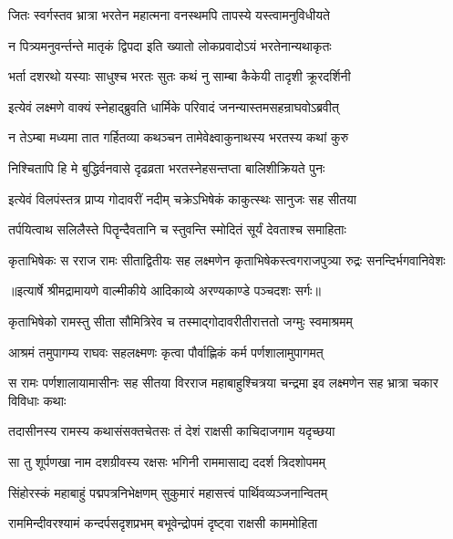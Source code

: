 \twolineshloka
{जितः स्वर्गस्तव भ्रात्रा भरतेन महात्मना}
{वनस्थमपि तापस्ये यस्त्वामनुविधीयते} %

\twolineshloka
{न पित्र्यमनुवर्न्तन्ते मातृकं द्विपदा इति}
{ख्यातो लोकप्रवादोऽयं भरतेनान्यथाकृतः} %

\twolineshloka
{भर्ता दशरथो यस्याः साधुश्च भरतः सुतः}
{कथं नु साम्बा कैकेयी तादृशी क्रूरदर्शिनी} %

\twolineshloka
{इत्येवं लक्ष्मणे वाक्यं स्नेहाद्ब्रुवति धार्मिके}
{परिवादं जनन्यास्तमसहन्राघवोऽब्रवीत्} %

\twolineshloka
{न तेऽम्बा मध्यमा तात गर्हितव्या कथञ्चन}
{तामेवेक्ष्वाकुनाथस्य भरतस्य कथां कुरु} %

\twolineshloka
{निश्चितापि हि मे बुद्धिर्वनवासे दृढव्रता}
{भरतस्नेहसन्तप्ता बालिशीक्रियते पुनः} %

\twolineshloka
{इत्येवं विलपंस्तत्र प्राप्य गोदावरीं नदीम्}
{चक्रेऽभिषेकं काकुत्स्थः सानुजः सह सीतया} %

\twolineshloka
{तर्पयित्वाथ सलिलैस्ते पितॄन्दैवतानि च}
{स्तुवन्ति स्मोदितं सूर्यं देवताश्च समाहिताः} %

\fourlineindentedshloka
{कृताभिषेकः स रराज रामः}
{सीताद्वितीयः सह लक्ष्मणेन}
{कृताभिषेकस्त्वगराजपुत्र्या}
{रुद्रः सनन्दिर्भगवानिवेशः} %


{॥इत्यार्षे श्रीमद्रामायणे वाल्मीकीये आदिकाव्ये अरण्यकाण्डे पञ्चदशः सर्गः॥}


\twolineshloka
{कृताभिषेको रामस्तु सीता सौमित्रिरेव च}
{तस्माद्गोदावरीतीरात्ततो जग्मुः स्वमाश्रमम्} %

\twolineshloka
{आश्रमं तमुपागम्य राघवः सहलक्ष्मणः}
{कृत्वा पौर्वाह्णिकं कर्म पर्णशालामुपागमत्} %

\threelineshloka
{स रामः पर्णशालायामासीनः सह सीतया}
{विरराज महाबाहुश्चित्रया चन्द्रमा इव}
{लक्ष्मणेन सह भ्रात्रा चकार विविधाः कथाः} %

\twolineshloka
{तदासीनस्य रामस्य कथासंसक्तचेतसः}
{तं देशं राक्षसी काचिदाजगाम यदृच्छया} %

\twolineshloka
{सा तु शूर्पणखा नाम दशग्रीवस्य रक्षसः}
{भगिनी राममासाद्य ददर्श त्रिदशोपमम्} %

\twolineshloka
{सिंहोरस्कं महाबाहुं पद्मपत्रनिभेक्षणम्}
{सुकुमारं महासत्त्वं पार्थिवव्यञ्जनान्वितम्} %

\twolineshloka
{राममिन्दीवरश्यामं कन्दर्पसदृशप्रभम्}
{बभूवेन्द्रोपमं दृष्ट्वा राक्षसी काममोहिता} %

